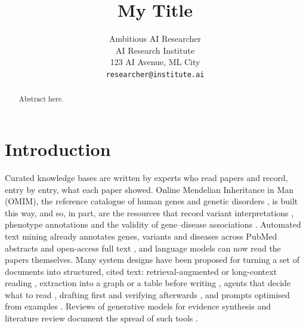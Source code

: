 \documentclass{article} %
\title{My Title}
\author{Ambitious AI Researcher\\
AI Research Institute\\
123 AI Avenue, ML City\\
\texttt{researcher@institute.ai}
}
\begin{document}
\maketitle

\begin{abstract}
Abstract here.
\end{abstract}

\section{Introduction}
\label{sec:intro}
Curated knowledge bases are written by experts who read papers and record, entry by entry, what each paper showed. Online Mendelian Inheritance in Man (OMIM), the reference catalogue of human genes and genetic disorders \citep{Amberger2014OmimorgOnline,amberger2019omim,hamosh2021online}, is built this way, and so, in part, are the resources that record variant interpretations \citep{Landrum2017ClinvarImproving,landrum2025clinvar}, phenotype annotations \citep{robinson2008human,gargano2024human} and the validity of gene--disease associations \citep{strande2017evaluating}. Automated text mining already annotates genes, variants and diseases across PubMed abstracts and open-access full text \citep{Wei2019PubtatorCentral,wei2024pubtator,allot2023tracking}, and language models can now read the papers themselves. Many system designs have been proposed for turning a set of documents into structured, cited text: retrieval-augmented or long-context reading \citep{Lewis2020RetrievalaugmentedGeneration,li2024retrieval}, extraction into a graph or a table before writing \citep{edge2024local,shankar2025docetl,joshi2026sliders}, agents that decide what to read \citep{Nakano2021WebgptBrowserassisted,Lla2023PaperqaRetrievalaugmented,skarlinski2024language}, drafting first and verifying afterwards \citep{Gao2022RarrResearching,dhuliawala2024chainofverification}, and prompts optimised from examples \citep{Khattab2023DspyCompiling,agrawal2026gepa}. Reviews of generative models for evidence synthesis and literature review document the spread of such tools \citep{Clark2025GenerativeArtificial,scherbakov2025emergence,cao2025automation,wang2025accelerating}.
\end{document}
